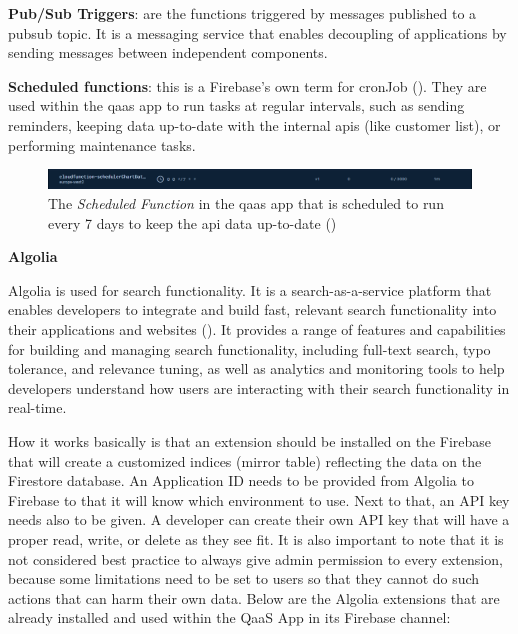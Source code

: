 \textbf{Pub/Sub Triggers}: are the functions triggered by messages published to a \acrshort{pubsub} topic.
It is a messaging service that enables decoupling of applications by sending messages between independent components.

\textbf{Scheduled functions}: this is a Firebase's own term for \gls{cronJob} (\textit{\cite{scheduleFunction}}).
They are used within the \acrshort{qaas} app to run tasks at regular intervals, such as sending reminders, keeping
data up-to-date with the internal \acrshort{api}s (like customer list), or performing maintenance tasks.

\begin{figure}[H]
      \centering
      \includegraphics[width=1.0\textwidth]{Figures/Firebase/Functions/CronJobs.png}
      \caption{The \textit{Scheduled Function}  in the \acrshort{qaas} app that is scheduled to run every 7 days to keep the \acrshort{api} data up-to-date
            (\textit{\cite{cronJobQaaSAppFunction}})}
\end{figure}

\textbf{Algolia}

Algolia is used for search functionality. It is a search-as-a-service platform that enables developers to
integrate and build fast, relevant search functionality into their applications and websites
(\textit{\cite{algolia}}). It provides a range of features and capabilities for building and managing search
functionality, including full-text search, typo tolerance, and relevance tuning, as well as analytics and
monitoring tools to help developers understand how users are interacting with their search functionality in
real-time.

How it works basically is that an extension should be installed on the Firebase that will create a customized
indices (mirror table) reflecting the data on the Firestore database. An Application ID needs to be provided
from Algolia to Firebase to that it will know which environment to use. Next to that, an API key needs also
to be given. A developer can create their own API key that will have a proper read, write, or delete as they see fit.
It is also important to note that it is not considered best practice to always give admin permission to every extension,
because some limitations need to be set to users so that they cannot do such actions that can harm their own data.
Below are the Algolia extensions that are already installed and used within the QaaS App in its Firebase
channel:

